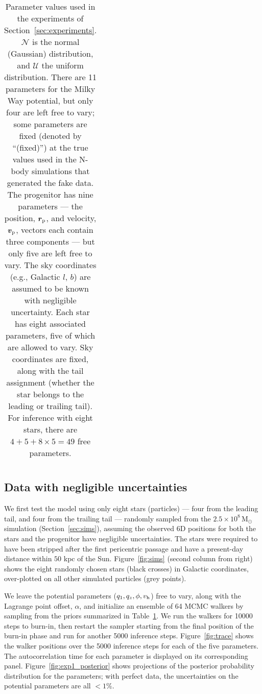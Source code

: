 \documentclass[letterpaper,12pt,preprint]{aastex}
\newcommand{\msun}{\mathrm{M}_\odot}
\newcommand{\bs}{\boldsymbol}
\newcommand{\Loffset}{\alpha}
\newcommand{\vhalo}{v_{\rm h}}
\begin{document}
\begin{table}[h]
\begin{center}
\begin{tabular}{l c l}
		\bottomrule
		\end{tabular}
	\caption{Parameter values used in the experiments of Section~\ref{sec:experiments}. $\mathcal{N}$ is the normal (Gaussian) distribution, and $\mathcal{U}$ the uniform distribution. There are 11 parameters for the Milky Way potential, but only four are left free to vary; some parameters are fixed (denoted by ``(fixed)'') at the true values used in the N-body simulations that generated the fake data. The progenitor has nine parameters --- the position, $\bs{r}_{\rm p}$, and velocity, $\bs{v}_{\rm p}$, vectors each contain three components --- but only five are left free to vary. The sky coordinates (e.g., Galactic $l$, $b$) are assumed to be known with negligible uncertainty. Each star has eight associated parameters, five of which are allowed to vary. Sky coordinates are fixed, along with the tail assignment (whether the star belongs to the leading or trailing tail). For inference with eight stars, there are $4+5+8\times5=49$ free parameters. \label{tbl:params}}
\end{center}
\end{table}

\subsection{Data with negligible uncertainties}\label{sec:exp1}

We first test the model using only eight stars (particles) --- four from the leading tail, and four from the trailing tail --- randomly sampled from the $2.5\times10^8\,\msun$ simulation (Section~\ref{sec:sims}), assuming the observed 6D positions for both the stars and the progenitor have negligible uncertainties. The stars were required to have been stripped after the first pericentric passage and have a present-day distance within $50$ kpc of the Sun. Figure~\ref{fig:sims} (second column from right) shows the eight randomly chosen stars (black crosses) in Galactic coordinates, over-plotted on all other simulated particles (grey points). 

We leave the potential parameters ($q_1,q_z,\phi,\vhalo$) free to vary, along with the Lagrange point offset, $\Loffset$, and initialize an ensemble of 64 MCMC walkers by sampling from the priors summarized in Table~\ref{tbl:params}. We run the walkers for 10000 steps to burn-in, then restart the sampler starting from the final position of the burn-in phase and run for another 5000 inference steps. Figure~\ref{fig:trace} shows the walker positions over the 5000 inference steps for each of the five parameters. The autocorrelation time for each parameter is displayed on its corresponding panel. Figure~\ref{fig:exp1_posterior} shows projections of the posterior probability distribution for the parameters; with perfect data, the uncertainties on the potential parameters are all $<1\%$.
\end{document}
